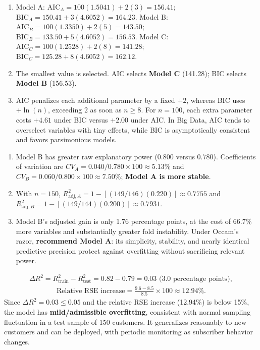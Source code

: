 \begin{solproblema}[prob:cb39746]
\begin{enumerate}
\item Model A: $\text{AIC}_A=100(1.5041)+2(3)=156.41$; $\text{BIC}_A=150.41+3(4.6052)=164.23$. Model B: $\text{AIC}_B=100(1.3350)+2(5)=143.50$; $\text{BIC}_B=133.50+5(4.6052)=156.53$. Model C: $\text{AIC}_C=100(1.2528)+2(8)=141.28$; $\text{BIC}_C=125.28+8(4.6052)=162.12$.
\item The smallest value is selected. AIC selects \textbf{Model C} (141.28); BIC selects \textbf{Model B} (156.53).
\item AIC penalizes each additional parameter by a fixed $+2$, whereas BIC uses $+\ln(n)$, exceeding 2 as soon as $n\ge8$. For $n=100$, each extra parameter costs $+4.61$ under BIC versus $+2.00$ under AIC. In Big Data, AIC tends to overselect variables with tiny effects, while BIC is asymptotically consistent and favors parsimonious models.
\end{enumerate}
\end{solproblema}

\begin{solproblema}[prob:2b2e597]
\begin{enumerate}
\item Model B has greater raw explanatory power (0.800 versus 0.780). Coefficients of variation are $CV_A=0.040/0.780\times100\approx5.13\%$ and $CV_B=0.060/0.800\times100\approx7.50\%$; \textbf{Model A is more stable}.
\item With $n=150$, $R^2_{\text{adj},A}=1-[(149/146)(0.220)]\approx0.7755$ and $R^2_{\text{adj},B}=1-[(149/144)(0.200)]\approx0.7931$.
\item Model B's adjusted gain is only 1.76 percentage points, at the cost of 66.7\% more variables and substantially greater fold instability. Under Occam's razor, \textbf{recommend Model A}: its simplicity, stability, and nearly identical predictive precision protect against overfitting without sacrificing relevant power.
\end{enumerate}
\end{solproblema}

\begin{solproblema}[prob:9689172]
\begin{align}
\Delta R^2=R^2_{\text{train}}-R^2_{\text{test}}=0.82-0.79=0.03\text{ (3.0 percentage points)},
\end{align}
\begin{align}
\text{Relative RSE increase}=\frac{9.6-8.5}{8.5}\times100\approx12.94\%.
\end{align}
Since $\Delta R^2=0.03\le0.05$ and the relative RSE increase (12.94\%) is below 15\%, the model has \textbf{mild/admissible overfitting}, consistent with normal sampling fluctuation in a test sample of 150 customers. It generalizes reasonably to new customers and can be deployed, with periodic monitoring as subscriber behavior changes.
\end{solproblema}
